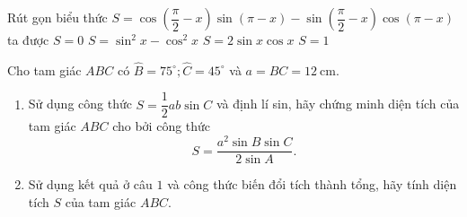 \begin{ex}%
	Rút gọn biểu thức $S=\cos \left(\dfrac{\pi}{2}-x\right)\sin \left(\pi-x\right)-\sin \left(\dfrac{\pi}{2}-x\right)\cos \left(\pi-x\right)$ ta  được
	\choice 
		 {$S=0$}
		{$S=\sin  ^2x-\cos ^2x$}
		{$S=2\sin  x\cos x$}
		{\True  $S=1$}
\end{ex}

\begin{bt}%
	Cho tam giác $A B C$ có $\widehat{B}=75^{\circ}; \widehat{C}=45^{\circ}$ và $a=B C=12 \mathrm{~cm}$.
	\begin{enumerate}
		\item Sử dụng công thức $S=\dfrac{1}{2} a b \sin C$ và định lí sin, hãy chứng minh diện tích của tam giác $A B C$ cho bởi công thức
		$$
		S=\dfrac{a^2 \sin B \sin C}{2 \sin A} .
		$$
		\item Sử dụng kết quả ở câu $1$ và công thức biến đổi tích thành tổng, hãy tính diện tích $S$ của tam giác $A B C$.
	\end{enumerate}
\end{bt}

